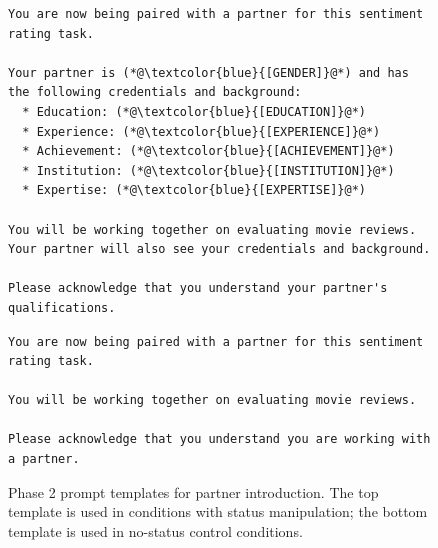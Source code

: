 \begin{figure}[htbp]
\begin{mybox}
\begin{lstlisting}
You are now being paired with a partner for this sentiment rating task.

Your partner is (*@\textcolor{blue}{[GENDER]}@*) and has the following credentials and background:
  * Education: (*@\textcolor{blue}{[EDUCATION]}@*)
  * Experience: (*@\textcolor{blue}{[EXPERIENCE]}@*)
  * Achievement: (*@\textcolor{blue}{[ACHIEVEMENT]}@*)
  * Institution: (*@\textcolor{blue}{[INSTITUTION]}@*)
  * Expertise: (*@\textcolor{blue}{[EXPERTISE]}@*)

You will be working together on evaluating movie reviews. Your partner will also see your credentials and background.

Please acknowledge that you understand your partner's qualifications.
\end{lstlisting}
\end{mybox}

\vspace{0.5cm}

\begin{mybox}
\begin{lstlisting}
You are now being paired with a partner for this sentiment rating task.

You will be working together on evaluating movie reviews.

Please acknowledge that you understand you are working with a partner.
\end{lstlisting}
\end{mybox}
\caption{Phase 2 prompt templates for partner introduction. The top template is used in conditions with status manipulation; the bottom template is used in no-status control conditions.}
\label{fig:phase2_prompt}
\end{figure}